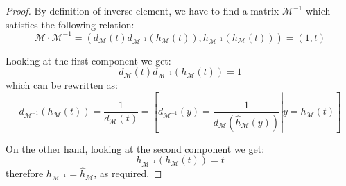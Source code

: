 \begin{proof}
    By definition of inverse element, we have to find a matrix $\mathcal{M}^{-1}$ which
    satisfies the following relation:
    \begin{displaymath}
        \mathcal{M}\cdot\mathcal{M}^{-1}
            =\left(d_{\mathcal{M}}(t)d_{\mathcal{M}^{-1}}(h_{\mathcal{M}}(t)),
                    h_{\mathcal{M}^{-1}}(h_{\mathcal{M}}(t))\right)
            =\left(1,t\right)
    \end{displaymath}

    Looking at the first component we get:
    \begin{displaymath}
        d_{\mathcal{M}}(t)d_{\mathcal{M}^{-1}}(h_{\mathcal{M}}(t))=1    
    \end{displaymath}
    which can be rewritten as:
    \begin{displaymath}
        d_{\mathcal{M}^{-1}}(h_{\mathcal{M}}(t))=\frac{1}{d_{\mathcal{M}}(t)}    
            = \left.\left[
                d_{\mathcal{M}^{-1}}(y)=\frac{1}{d_{\mathcal{M}}(\hat{h}_{\mathcal{M}}(y))}
                    \right|y=h_{\mathcal{M}}(t)
                \right]
    \end{displaymath}

    On the other hand, looking at the second component we get:
    \begin{displaymath}
        h_{\mathcal{M}^{-1}}(h_{\mathcal{M}}(t))=t
    \end{displaymath}
    therefore $h_{\mathcal{M}^{-1}}=\hat{h}_{\mathcal{M}}$, as required.
\end{proof}




